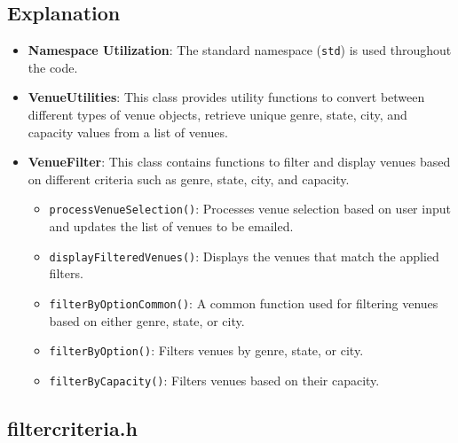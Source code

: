 \documentclass{article}
\begin{document}
	\subsection*{Explanation}
	\begin{itemize}
		\item \textbf{Namespace Utilization}: The standard namespace (\texttt{std}) is used throughout the code.
		\item \textbf{VenueUtilities}: This class provides utility functions to convert between different types of venue objects, retrieve unique genre, state, city, and capacity values from a list of venues.
		\item \textbf{VenueFilter}: This class contains functions to filter and display venues based on different criteria such as genre, state, city, and capacity.
		\begin{itemize}
			\item \texttt{processVenueSelection()}: Processes venue selection based on user input and updates the list of venues to be emailed.
			\item \texttt{displayFilteredVenues()}: Displays the venues that match the applied filters.
			\item \texttt{filterByOptionCommon()}: A common function used for filtering venues based on either genre, state, or city.
			\item \texttt{filterByOption()}: Filters venues by genre, state, or city.
			\item \texttt{filterByCapacity()}: Filters venues based on their capacity.
		\end{itemize}
	\end{itemize}
	
	\subsection{filtercriteria.h}
	
\end{document}
